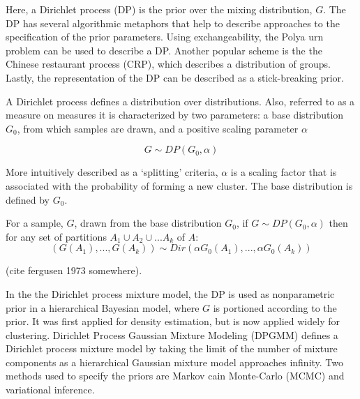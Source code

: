 Here, a Dirichlet process (DP) is the prior over the mixing distribution, $G$.  The DP has several algorithmic metaphors that help to describe approaches to the specification of the prior parameters.  Using exchangeability, the Polya urn problem can be used to describe a DP.  Another popular scheme is the the Chinese restaurant process (CRP), which describes a distribution of groups.  Lastly, the representation of the DP can be described as a stick-breaking prior.

A Dirichlet process defines a distribution over distributions. Also, referred to as a measure on measures it is characterized by two parameters: a base distribution $G_0$, from which samples are drawn, and a positive scaling parameter $\alpha$

$$G \sim DP(G_0,\alpha)$$

More intuitively described as a `splitting' criteria, $\alpha$ is a scaling factor that is associated with the probability of forming a new cluster.  The base distribution is defined by $G_0$.

For a sample, $G$, drawn from the base distribution $G_0$, if $G \sim DP(G_0,\alpha)$ then for any set of partitions $A_1 \cup A_2 \cup ... A_k$ of $A$:
$$(G(A_1),...,G(A_k)) \sim Dir(\alpha G_0(A_1),...,\alpha G_0(A_k))$$

(cite fergusen 1973 somewhere).

In the the Dirichlet process mixture model, the DP is used as nonparametric prior in a hierarchical Bayesian model, where $G$ is portioned according to the prior.   It was first applied for density estimation, but is now applied widely for clustering.   Dirichlet Process Gaussian Mixture Modeling (DPGMM) defines a  Dirichlet process mixture model by taking the limit of the number of mixture components as a hierarchical Gaussian mixture model approaches infinity.  Two methods used to specify the priors are Markov cain Monte-Carlo (MCMC) and variational inference.






